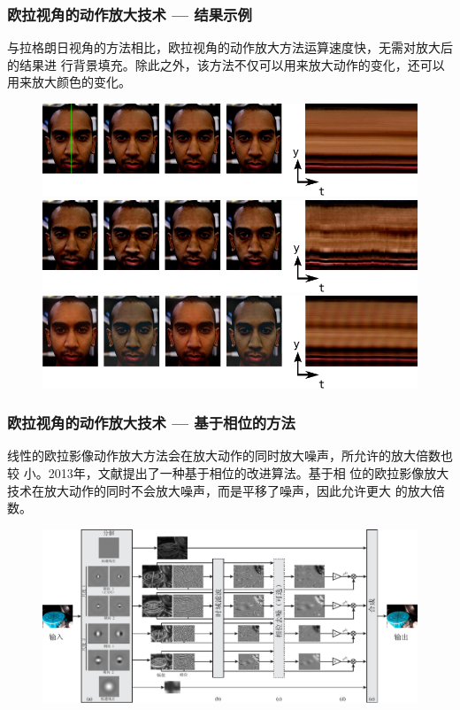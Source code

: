 \documentclass[xcolor=svgnames,serif,table,10pt]{beamer}
\begin{document}
\begin{frame}
  \frametitle{欧拉视角的动作放大技术 --- 结果示例}
  \small
  与拉格朗日视角的方法相比，欧拉视角的动作放大方法运算速度快，无需对放大后的结果进
行背景填充。除此之外，该方法不仅可以用来放大动作的变化，还可以用来放大颜色的变化。
  \begin{figure}[htbp]
  \centering
    \includegraphics[width=.65\textwidth]{motion-color-1.pdf}\\
    \includegraphics[width=.65\textwidth]{motion-color-2.pdf}\\
    \includegraphics[width=.65\textwidth]{motion-color-3.pdf}\\
  \end{figure}
\end{frame}

\begin{frame}
  \frametitle{欧拉视角的动作放大技术 --- 基于相位的方法}
  \small
  
  线性的欧拉影像动作放大方法会在放大动作的同时放大噪声，所允许的放大倍数也较
  小。2013年，文献\cite{Wadhwa2013PhaseBased}提出了一种基于相位的改进算法。基于相
  位的欧拉影像放大技术在放大动作的同时不会放大噪声，而是平移了噪声，因此允许更大
  的放大倍数。

  \begin{figure}[htbp]
  \centering
  \includegraphics[width=.9\textwidth]{phase.pdf}
  \label{fig:phase-based}
  \end{figure}
\end{frame}
\end{document}
